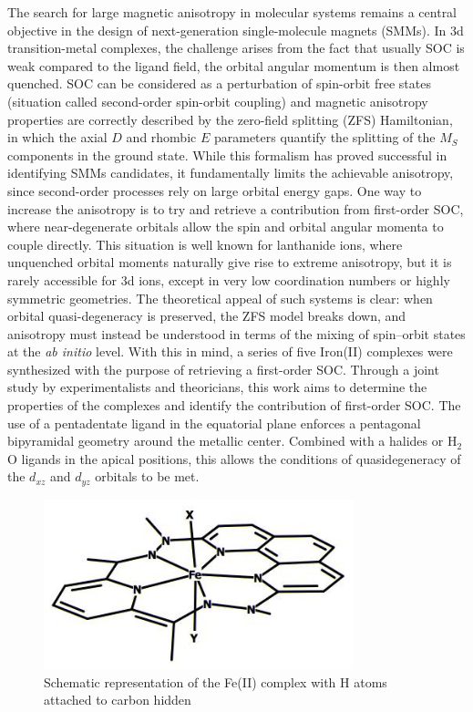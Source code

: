 \documentclass[12pt]{report}
\numberwithin{equation}{section}
\begin{document}
The search for large magnetic anisotropy in molecular systems remains a central objective in the design of next-generation single-molecule magnets (SMMs).
In 3d transition-metal complexes, the challenge arises from the fact that usually SOC is weak compared to the ligand field, the orbital angular momentum is then almost quenched. SOC can be considered as a perturbation of spin-orbit free states (situation called second-order spin-orbit coupling) and magnetic anisotropy properties are correctly described by the zero-field splitting (ZFS) Hamiltonian, in which the axial $D$ and rhombic $E$ parameters quantify the splitting of the $M_S$ components in the ground state.
While this formalism has proved successful in identifying SMMs candidates, it fundamentally limits the achievable anisotropy, since second-order processes rely on large orbital energy gaps.
One way to increase the anisotropy is to try and retrieve a contribution from first-order SOC, where near-degenerate orbitals allow the spin and orbital angular momenta to couple directly.
This situation is well known for lanthanide ions, where unquenched orbital moments naturally give rise to extreme anisotropy, but it is rarely accessible for 3d ions, except in very low coordination numbers or highly symmetric geometries.
The theoretical appeal of such systems is clear: when orbital quasi-degeneracy is preserved, the ZFS model breaks down, and anisotropy must instead be understood in terms of the mixing of spin–orbit states at the \textit{ab initio} level.
With this in mind, a series of five Iron(II) complexes were synthesized with the purpose of retrieving a first-order SOC.
Through a joint study by experimentalists and theoricians, this work aims to determine the properties of the complexes and identify the contribution of first-order SOC.
The use of a pentadentate ligand in the equatorial plane enforces a pentagonal bipyramidal geometry around the metallic center.
Combined with a halides or H$_2$O ligands in the apical positions, this allows the conditions of quasidegeneracy of the $d_{xz}$ and $d_{yz}$ orbitals to be met.
\begin{figure}[!ht]
    \centering
    \includegraphics[width=0.8\textwidth]{Images/ComplexFe.XY.jpg}
    \caption[Schematic representation of the Fe(II) complex]{Schematic representation of the Fe(II) complex with H atoms attached to carbon hidden}
    \label{FeComplex}
\end{figure}
\end{document}
